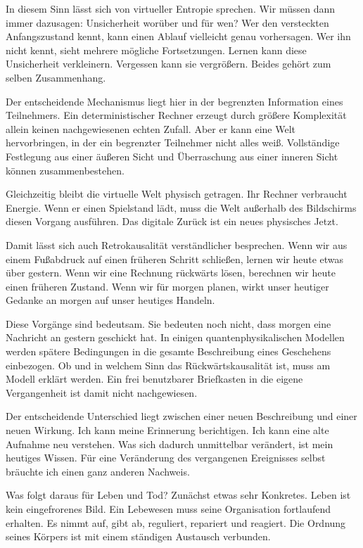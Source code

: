 In diesem Sinn lässt sich von virtueller Entropie sprechen. Wir müssen dann immer dazusagen: Unsicherheit worüber und für wen? Wer den versteckten Anfangszustand kennt, kann einen Ablauf vielleicht genau vorhersagen. Wer ihn nicht kennt, sieht mehrere mögliche Fortsetzungen. Lernen kann diese Unsicherheit verkleinern. Vergessen kann sie vergrößern. Beides gehört zum selben Zusammenhang.

Der entscheidende Mechanismus liegt hier in der begrenzten Information eines Teilnehmers. Ein deterministischer Rechner erzeugt durch größere Komplexität allein keinen nachgewiesenen echten Zufall. Aber er kann eine Welt hervorbringen, in der ein begrenzter Teilnehmer nicht alles weiß. Vollständige Festlegung aus einer äußeren Sicht und Überraschung aus einer inneren Sicht können zusammenbestehen.

Gleichzeitig bleibt die virtuelle Welt physisch getragen. Ihr Rechner verbraucht Energie. Wenn er einen Spielstand lädt, muss die Welt außerhalb des Bildschirms diesen Vorgang ausführen. Das digitale Zurück ist ein neues physisches Jetzt.

Damit lässt sich auch Retrokausalität verständlicher besprechen. Wenn wir aus einem Fußabdruck auf einen früheren Schritt schließen, lernen wir heute etwas über gestern. Wenn wir eine Rechnung rückwärts lösen, berechnen wir heute einen früheren Zustand. Wenn wir für morgen planen, wirkt unser heutiger Gedanke an morgen auf unser heutiges Handeln.

Diese Vorgänge sind bedeutsam. Sie bedeuten noch nicht, dass morgen eine Nachricht an gestern geschickt hat. In einigen quantenphysikalischen Modellen werden spätere Bedingungen in die gesamte Beschreibung eines Geschehens einbezogen. Ob und in welchem Sinn das Rückwärtskausalität ist, muss am Modell erklärt werden. Ein frei benutzbarer Briefkasten in die eigene Vergangenheit ist damit nicht nachgewiesen.

Der entscheidende Unterschied liegt zwischen einer neuen Beschreibung und einer neuen Wirkung. Ich kann meine Erinnerung berichtigen. Ich kann eine alte Aufnahme neu verstehen. Was sich dadurch unmittelbar verändert, ist mein heutiges Wissen. Für eine Veränderung des vergangenen Ereignisses selbst bräuchte ich einen ganz anderen Nachweis.

Was folgt daraus für Leben und Tod? Zunächst etwas sehr Konkretes. Leben ist kein eingefrorenes Bild. Ein Lebewesen muss seine Organisation fortlaufend erhalten. Es nimmt auf, gibt ab, reguliert, repariert und reagiert. Die Ordnung seines Körpers ist mit einem ständigen Austausch verbunden.

